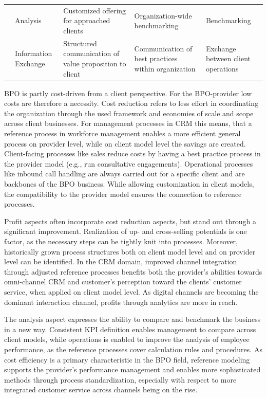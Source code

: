 \begin{table}[caption={Benefits of Reference Modelling for BPO-providers in CRM }, label=tab:refmodbpobenefits]
\begin{tabular}{p{1cm} p{2cm} |p{3cm} | p{3cm} | p{3cm} |}
		\multicolumn{1}{|l|}{}                                   & Analysis                            & Customized offering for approached clients              & Organization-wide benchmarking                     & Benchmarking                                                        \\ \cline{2-5} 
		\multicolumn{1}{|l|}{}                                   & Information Exchange                & Structured communication of value proposition to client & Communication of best practices within organization & Exchange between client operations                                  \\ \hline
	\end{tabular}
\end{table}

BPO is partly cost-driven from a client perspective. For the BPO-provider low costs are therefore a necessity. Cost reduction refers to less effort in coordinating the organization through the used framework and economies of scale and scope across client businesses. For management processes in CRM this means, that a reference process in workforce management enables a more efficient general process on provider level, while on client model level the savings are created. Client-facing processes like sales reduce costs by having a best practice process in the provider model (e.g., run consultative engagements). Operational processes like inbound call handling are always carried out for a specific client and are backbones of the BPO business. While allowing customization in client models, the compatibility to the provider model ensures the connection to reference processes.

Profit aspects often incorporate cost reduction aspects, but stand out through a significant improvement. Realization of up- and cross-selling potentials is one factor, as the necessary steps can be tightly knit into processes. Moreover, historically grown process structures both on client model level and on provider level can be identified. In the CRM domain, improved channel integration through adjusted reference processes benefits both the provider’s abilities towards omni-channel CRM and customer’s perception toward the clients’ customer service, when applied on client model level. As digital channels are becoming the dominant interaction channel, profits through analytics are more in reach.

The analysis aspect expresses the ability to compare and benchmark the business in a new way. Consistent KPI definition enables management to compare across client models, while operations is enabled to improve the analysis of employee performance, as the reference processes cover calculation rules and procedures. As cost efficiency is a primary characteristic in the BPO field, reference modeling supports the provider’s performance management and enables more sophisticated methods through process standardization, especially with respect to more integrated customer service across channels being on the rise.

